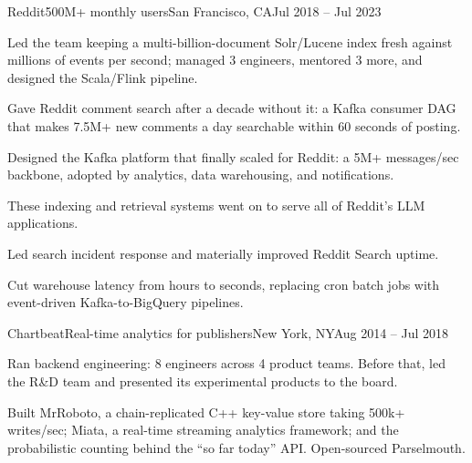 \documentclass{resume}
\begin{document}
\begin{company}{Reddit}{500M+ monthly users}{San Francisco, CA}{Jul 2018 -- Jul 2023} %
\begin{bullets}
    \item {} Led the team keeping a multi-billion-document
          Solr/Lucene index fresh against millions of events per second;
          managed 3 engineers, mentored 3 more, and designed the Scala/Flink
          pipeline.
    \item {} Gave Reddit comment search after a decade
          without it: a Kafka consumer DAG that makes 7.5M+ new comments a day
          searchable within 60 seconds of posting.
    \item {} Designed the Kafka platform that finally
          scaled for Reddit: a 5M+ messages/sec backbone, adopted by analytics,
          data warehousing, and notifications.
    \item {} These indexing and retrieval systems went on to
          serve all of Reddit's LLM applications.
    \item {} Led search incident response and materially
          improved Reddit Search uptime.
\end{bullets}
\begin{bullets}
    \item {} Cut warehouse latency from hours to
          seconds, replacing cron batch jobs with event-driven
          Kafka-to-BigQuery pipelines.
\end{bullets}
\end{company}

\begin{company}{Chartbeat}{Real-time analytics for publishers}{New York, NY}{Aug 2014 -- Jul 2018} %
\begin{bullets}
    \item {} Ran backend engineering: 8 engineers across 4
          product teams. Before that, led the R\&D team and presented its
          experimental products to the board.
    \item {} Built MrRoboto, a chain-replicated C++ key-value
          store taking 500k+ writes/sec; Miata, a real-time streaming analytics
          framework; and the probabilistic counting behind the ``so far today''
          API\@. Open-sourced Parselmouth.
\end{bullets}
\end{company}
\end{document}
